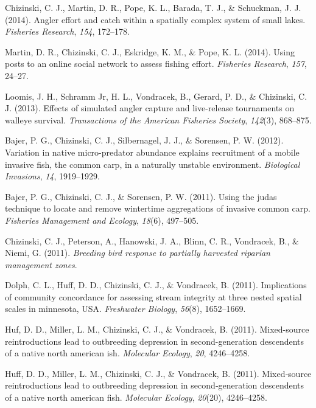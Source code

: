 \documentclass[
  12pt,
]
{article}
\newlength{\cslhangindent}
\newlength{\cslentryspacingunit} %
\newenvironment{CSLReferences}[2] %
 {%
  \setlength{\parindent}{0pt}
  \ifodd #1
  \let\oldpar\par
  \def\par{\hangindent=\cslhangindent\oldpar}
  \fi
  \setlength{\parskip}{#2\cslentryspacingunit}
 }%
 {}
\begin{document}
\begin{CSLReferences}{1}{0}
\leavevmode{}%
Chizinski, C. J., Martin, D. R., Pope, K. L., Barada, T. J., \&
Schuckman, J. J. (2014). Angler effort and catch within a spatially
complex system of small lakes. \emph{Fisheries Research}, \emph{154},
172--178.

\leavevmode{}%
Martin, D. R., Chizinski, C. J., Eskridge, K. M., \& Pope, K. L. (2014).
Using posts to an online social network to assess fishing effort.
\emph{Fisheries Research}, \emph{157}, 24--27.

\leavevmode{}%
Loomis, J. H., Schramm Jr, H. L., Vondracek, B., Gerard, P. D., \&
Chizinski, C. J. (2013). Effects of simulated angler capture and
live-release tournaments on walleye survival. \emph{Transactions of the
American Fisheries Society}, \emph{142}(3), 868--875.

\leavevmode{}%
Bajer, P. G., Chizinski, C. J., Silbernagel, J. J., \& Sorensen, P. W.
(2012). Variation in native micro-predator abundance explains
recruitment of a mobile invasive fish, the common carp, in a naturally
unstable environment. \emph{Biological Invasions}, \emph{14},
1919--1929.

\leavevmode{}%
Bajer, P. G., Chizinski, C. J., \& Sorensen, P. W. (2011). Using the
judas technique to locate and remove wintertime aggregations of invasive
common carp. \emph{Fisheries Management and Ecology}, \emph{18}(6),
497--505.

\leavevmode{}%
Chizinski, C. J., Peterson, A., Hanowski, J. A., Blinn, C. R.,
Vondracek, B., \& Niemi, G. (2011). \emph{Breeding bird response to
partially harvested riparian management zones}.

\leavevmode{}%
Dolph, C. L., Huff, D. D., Chizinski, C. J., \& Vondracek, B. (2011).
Implications of community concordance for assessing stream integrity at
three nested spatial scales in minnesota, USA. \emph{Freshwater
Biology}, \emph{56}(8), 1652--1669.

\leavevmode{}%
Huf, D. D., Miller, L. M., Chizinski, C. J., \& Vondracek, B. (2011).
Mixed-source reintroductions lead to outbreeding depression in
second-generation descendents of a native north american ish.
\emph{Molecular Ecology}, \emph{20}, 4246--4258.

\leavevmode{}%
Huff, D. D., Miller, L. M., Chizinski, C. J., \& Vondracek, B. (2011).
Mixed‐source reintroductions lead to outbreeding depression in
second‐generation descendents of a native north american fish.
\emph{Molecular Ecology}, \emph{20}(20), 4246--4258.

\end{CSLReferences}
\end{document}
